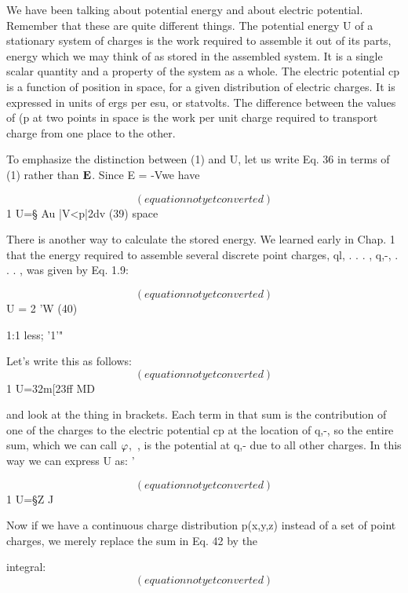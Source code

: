 We have been talking about potential energy and about electric
potential. Remember that these are quite different things. The potential
energy U of a stationary system of charges is the work required
to assemble it out of its parts, energy which we may think of as stored
in the assembled system. It is a single scalar quantity and a property
of the system as a whole. The electric potential cp is a function of
position in space, for a given distribution of electric charges. It is
expressed in units of ergs per esu, or statvolts. The difference between
the values of (p at two points in space is the work per unit
charge required to transport charge from one place to the other.

To emphasize the distinction between (1) and U, let us write Eq. 36
in terms of (1) rather than $\mathbf{E}$. Since E = -V\pot we have

\begin{equation}
(equation not yet converted)
\end{equation}
1
U=§ Au |V<p|2dv (39)
space

There is another way to calculate the stored energy. We learned
early in Chap. 1 that the energy required to assemble several discrete
point charges, ql, . . . , q,-, . . . , was given by Eq. 1.9:

\begin{equation}
(equation not yet converted)
\end{equation}
U =  2 'W (40)

1:1 less; '1'"

Let's write this as follows:
\begin{equation}
(equation not yet converted)
\end{equation}
1
U=32m[23ff MD

and look at the thing in brackets. Each term in that sum is the contribution
of one of the charges to the electric potential cp at the location
of q,-, so the entire sum, which we can call $\varphi$,~, is the potential at
q,- due to all other charges. In this way we can express U as: '

\begin{equation}
(equation not yet converted)
\end{equation}
1
U=§Z%
J

Now if we have a continuous charge distribution p(x,y,z) instead of
a set of point charges, we merely replace the sum in Eq. 42 by the

integral:
\begin{equation}
(equation not yet converted)
\end{equation}

